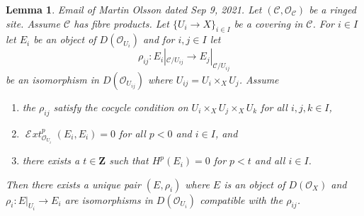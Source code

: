 \documentclass{stacks-project}
\newenvironment{reference}{\comment}{\endcomment}
\theoremstyle{plain}
\newtheorem{lemma}[subsection]{Lemma}
\theoremstyle{definition}
\theoremstyle{remark}
\numberwithin{equation}{subsection}
\def\SheafExt{\mathop{\mathcal{E}\!\mathit{xt}}\nolimits}
\begin{document}
\begin{lemma}
\label{lemma-bbd-glueing-cech}
\begin{reference}
Email of Martin Olsson dated Sep 9, 2021.
\end{reference}
Let $(\mathcal{C}, \mathcal{O}_\mathcal{C})$ be a ringed site.
Assume $\mathcal{C}$ has fibre products.
Let $\{U_i \to X\}_{i \in I}$ be a covering in $\mathcal{C}$.
For $i \in I$ let $E_i$ be an object of $D(\mathcal{O}_{U_i})$ and
for $i, j \in I$ let
$$
\rho_{ij} : E_i|_{\mathcal{C}/U_{ij}} \longrightarrow E_j|_{\mathcal{C}/U_{ij}}
$$
be an isomorphism in $D(\mathcal{O}_{U_{ij}})$ where
$U_{ij} = U_i \times_X U_j$. Assume
\begin{enumerate}
\item the $\rho_{ij}$ satisfy the cocycle condition on
$U_i \times_X U_j \times_X U_k$ for all $i, j, k \in I$,
\item $\SheafExt^p_{\mathcal{O}_{U_i}}(E_i, E_i) = 0$
for all $p < 0$ and $i \in I$, and
\item there exists a $t \in \mathbf{Z}$ such that
$H^p(E_i) = 0$ for $p < t$ and all $i \in I$.
\end{enumerate}
Then there exists a unique pair $(E, \rho_i)$ where $E$ is an object of 
$D(\mathcal{O}_X)$ and $\rho_i : E|_{U_i} \to E_i$ are isomorphisms in
$D(\mathcal{O}_{U_i})$ compatible with the $\rho_{ij}$.
\end{lemma}
\end{document}
